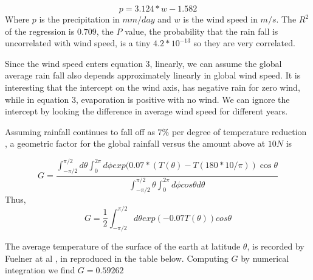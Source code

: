 \documentclass{book}
\begin{document}
   \begin{equation}
    p = 3.124 * w - 1.582 
   	\end{equation}
   Where $p$ is the precipitation in $mm/day$ and $w$ is the wind speed in $m/s$. The $R^2$ of the regression is $0.709$, the $P$ value, the probability that the rain fall is uncorrelated with wind speed, is a tiny
   $4.2*10^{-13}$ so they are very correlated.
   
   Since the wind speed enters equation 3, linearly, we can assume the global average rain fall also depends approximately linearly in global wind speed. It is interesting that the intercept on the wind axis, has negative rain for zero wind, while in equation 3, evaporation is positive with no wind. We can ignore the intercept by looking the difference in average wind speed for different years. 
   
   Assuming rainfall continues to fall off as $7\%$ per degree of temperature reduction \cite{rainrise}, a geometric factor for the global rainfall versus the amount above at $10N$ is
   
   \begin{equation}
   	G = \frac{ \int_{-\pi/2}^{\pi/2}d\theta \int_0^{2\pi} d\phi exp(0.07 *(T(\theta)-T( 180 * 10/\pi))\cos \theta }{ \int_{-\pi/2}^{\pi/2}\theta \int_0^{2\pi} d\phi cos \theta d\theta }
   \end{equation}
Thus,
\begin{equation}
	G = \frac{1}{2}\int_{-\pi/2}^{\pi/2}d\theta  exp(-0.07 T(\theta))cos \theta
\end{equation}
   
      The average temperature of the surface of the earth at latitude $\theta$, is recorded by Fuelner at al \cite{Feulner}, in reproduced in the table below. Computing $G$ by numerical integration we find $G = 0.59262$
      
\end{document}
